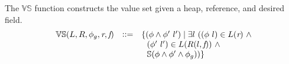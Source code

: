 \begin{definition}
\label{def:VS}
The $\mathbb{VS}$ function constructs the value set given a
heap, reference, and desired field.
\[
\begin{array}{rcl}
  \mathbb{VS}(L,R,\phi_g,\emph{r},\emph{f}) & \vcentcolon \vcentcolon= &
  \{(\phi\wedge\phi^\prime\ l^\prime) \mid \exists
  l\ ((\phi\ l) \in L(\emph{r})\ \wedge \\ & &
  \ \ (\phi^\prime\ l^\prime) \in L(R(l,\emph{f}))\ \wedge \\ & &
  \ \ \mathbb{S}(\phi\wedge\phi^\prime\wedge \phi_g))\}
\end{array}
\]
\end{definition}
